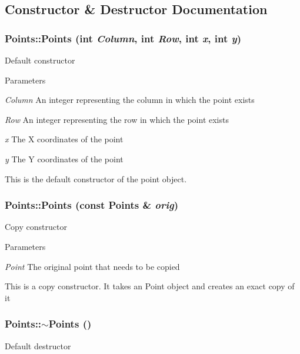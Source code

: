 \subsection{Constructor \& Destructor Documentation}
\hypertarget{classPoints_aeaf6778964752a6ed2e00df462c4a439}{
\subsubsection[{Points}]{\setlength{\rightskip}{0pt plus 5cm}Points::Points (int {\em Column}, \/  int {\em Row}, \/  int {\em x}, \/  int {\em y})}}
\label{classPoints_aeaf6778964752a6ed2e00df462c4a439}
Default constructor 
\begin{DoxyParams}{Parameters}
\item[{\em Column}]An integer representing the column in which the point exists \item[{\em Row}]An integer representing the row in which the point exists \item[{\em x}]The X coordinates of the point \item[{\em y}]The Y coordinates of the point\end{DoxyParams}
This is the default constructor of the point object. \hypertarget{classPoints_ab240074a27bcb6823ac99a1b81213545}{
\subsubsection[{Points}]{\setlength{\rightskip}{0pt plus 5cm}Points::Points (const {\bf Points} \& {\em orig})}}
\label{classPoints_ab240074a27bcb6823ac99a1b81213545}
Copy constructor 
\begin{DoxyParams}{Parameters}
\item[{\em Point}]The original point that needs to be copied\end{DoxyParams}
This is a copy constructor. It takes an Point object and creates an exact copy of it \hypertarget{classPoints_a9d56d7dc8b6a6f492e07d354eb379c12}{
\subsubsection[{$\sim$Points}]{\setlength{\rightskip}{0pt plus 5cm}Points::$\sim$Points ()}}
\label{classPoints_a9d56d7dc8b6a6f492e07d354eb379c12}
Default destructor

